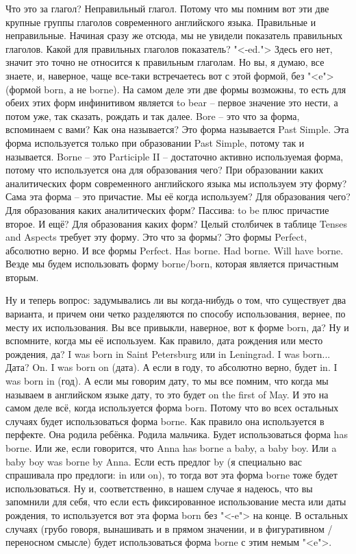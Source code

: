 \documentclass[main.tex]{subfiles}
\begin{document}
Что это за глагол?
Неправильный глагол.
Потому что мы помним вот эти две крупные группы глаголов современного английского языка.
Правильные и неправильные.
Начиная сразу же отсюда, мы не увидели показатель правильных глаголов.
Какой для правильных глаголов показатель?
"<-ed.">
Здесь его нет, значит это точно не относится к правильным глаголам.
Но вы, я думаю, все знаете, и, наверное, чаще все-таки встречаетесь вот с этой формой, без "<e"> (формой born, а не borne).
На самом деле эти две формы возможны, то есть для обеих этих форм инфинитивом является to bear -- первое значение это нести, а потом уже, так сказать, рождать и так далее.
Bore -- это что за форма, вспоминаем с вами?
Как она называется?
Это форма называется Past Simple.
Эта форма используется только при образовании Past Simple, потому так и называется.
Borne -- это Participle II -- достаточно активно используемая форма, потому что используется она для образования чего?
При образовании каких аналитических форм современного английского языка мы используем эту форму?
Сама эта форма -- это причастие.
Мы её когда используем?
Для образования чего?
Для образования каких аналитических форм?
Пассива: to be плюс причастие второе.
И ещё?
Для образования каких форм?
Целый столбичек в таблице Tenses and Aspects требует эту форму.
Это что за формы?
Это формы Perfect, абсолютно верно.
И все формы Perfect.
Has borne.
Had borne.
Will have borne.
Везде мы будем использовать форму borne/born, которая является причастным вторым.

Ну и теперь вопрос: задумывались ли вы когда-нибудь о том, что существует два варианта, и причем они четко разделяются по способу использования, вернее, по месту их использования.
Вы все привыкли, наверное, вот к форме born, да?
Ну и вспомните, когда мы её используем.
Как правило, дата рождения или место рождения, да?
I was born in Saint Petersburg или in Leningrad.
I was born...
Дата?
On.
I was born on (дата).
А если в году, то абсолютно верно, будет in.
I was born in (год).
А если мы говорим дату, то мы все помним, что когда мы называем в английском языке дату, то это будет on the first of May.
И это на самом деле всё, когда используется форма born.
Потому что во всех остальных случаях будет использоваться форма borne.
Как правило она используется в перфекте.
Она родила ребёнка.
Родила мальчика.
Будет использоваться форма has borne.
Или же, если говорится, что Anna has borne a baby, a baby boy.
Или a baby boy was borne by Anna.
Если есть предлог by (я специально вас спрашивала про предлоги: in или on), то тогда вот эта форма borne тоже будет использоваться.
Ну и, соответственно, в нашем случае я надеюсь, что вы запомнили для себя, что если есть фиксированное использование места или даты рождения, то используется вот эта форма born без "<-e"> на конце.
В остальных случаях (грубо говоря, вынашивать и в прямом значении, и в фигуративном / переносном смысле) будет использоваться форма borne с этим немым "<e">.
\end{document}
